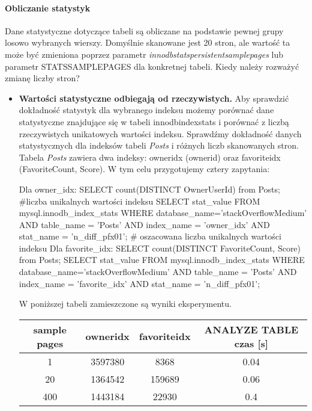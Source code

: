 \paragraph{Obliczanie statystyk}
Dane statystyczne dotyczące tabeli są obliczane na podstawie pewnej grupy losowo wybranych wierszy. Domyślnie skanowane jest 20 stron, ale wartość ta może być zmieniona poprzez parametr \textit{innodb\textunderscore stats\textunderscore persistent\textunderscore sample\textunderscore pages} lub parametr STATS\textunderscore SAMPLE\textunderscore PAGES dla konkretnej tabeli. Kiedy należy rozważyć zmianę liczby stron?
\begin{itemize}
	\item \textbf{Wartości statystyczne odbiegają od rzeczywistych.} \linebreak
	Aby sprawdzić dokładność statystyk dla wybranego indeksu możemy porównać dane statystyczne znajdujące się w tabeli innodb\textunderscore index\textunderscore stats i porównać z liczbą rzeczywistych unikatowych wartości indeksu. Sprawdźmy dokładność danych statystycznych dla indeksów tabeli \textit{Posts} i różnych liczb skanowanych stron. Tabela \textit{Posts} zawiera dwa indeksy: owner\textunderscore idx (owner\textunderscore id) oraz favorite\textunderscore idx (FavoriteCount, Score).
	W tym celu przygotujemy cztery zapytania:
	\begin{spverbatim}
		Dla owner_idx:
		SELECT count(DISTINCT OwnerUserId) from Posts; #liczba unikalnych wartości indeksu
		SELECT stat_value FROM mysql.innodb_index_stats WHERE database_name='stackOverflowMedium' AND table_name = 'Posts' AND index_name = 'owner_idx' AND 
		stat_name = 'n_diff_pfx01'; # oszacowana liczba unikalnych wartości indeksu
		Dla favorite_idx:
		SELECT count(DISTINCT FavoriteCount, Score) from Posts;
		SELECT stat_value FROM mysql.innodb_index_stats WHERE database_name='stackOverflowMedium' AND table_name = 'Posts' AND index_name = 'favorite_idx' AND 
		stat_name = 'n_diff_pfx01';
	\end{spverbatim}
	W poniższej tabeli zamieszczone są wyniki eksperymentu.
	\begin{center}
		\begin{tabular}{ |c|c|c|c| } 
			\hline
			sample pages & owner\textuderscore idx & favorite\textunderscore idx & ANALYZE TABLE czas [s]\\ 
			\hline
			1 & 3597380 & 8368 & 0.04\\
			20 & 1364542 & 159689 & 0.06\\
			400 & 1443184 & 22930 & 0.4\\

\end{tabular}
\end{center}
\end{itemize}
